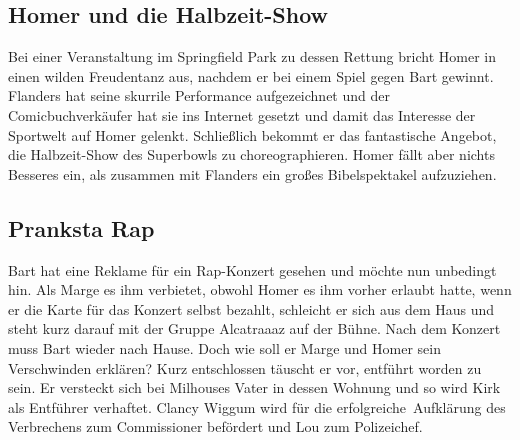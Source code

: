 \subsection{Homer und die Halbzeit-Show}\label{GABF02}
Bei einer Veranstaltung im Springfield Park zu dessen Rettung bricht Homer in einen wilden Freudentanz aus, nachdem er bei einem Spiel gegen Bart gewinnt. Flanders hat seine skurrile Performance aufgezeichnet und der Comicbuchverkäufer hat sie ins Internet gesetzt und damit das Interesse der Sportwelt auf Homer gelenkt. Schließlich bekommt er das fantastische Angebot, die Halbzeit-Show des Superbowls zu choreographieren. Homer fällt aber nichts Besseres ein, als zusammen mit Flanders ein großes Bibelspektakel aufzuziehen.


\subsection{Pranksta Rap}\label{GABF03}
Bart hat eine Reklame für ein Rap-Konzert gesehen und möchte nun unbedingt hin. Als Marge es ihm verbietet, obwohl Homer es ihm vorher erlaubt hatte, wenn er die Karte für das Konzert selbst bezahlt, schleicht er sich aus dem Haus und steht kurz darauf mit der Gruppe Alcatraaaz auf der Bühne. Nach dem Konzert muss Bart wieder nach Hause. Doch wie soll er Marge und Homer sein Verschwinden erklären? Kurz entschlossen täuscht er vor, entführt worden zu sein. Er versteckt sich bei Milhouses Vater in dessen Wohnung und so wird Kirk als Entführer verhaftet. Clancy Wiggum wird für die \glqq erfolgreiche\grqq\ Aufklärung des Verbrechens zum Commissioner befördert und Lou zum Polizeichef.


